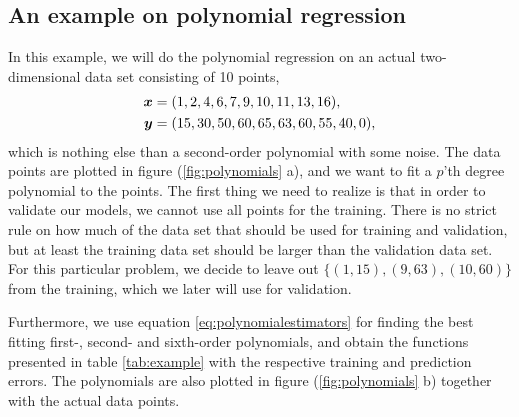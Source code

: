 \subsection{An example on polynomial regression} \label{sec:example}
In this example, we will do the polynomial regression on an actual two-dimensional data set consisting of 10 points,
\begin{equation}
\begin{aligned}
\boldsymbol{{x}}&=(1,2,4,6,7,9,10,11,13,16),\\
\boldsymbol{{y}}&=(15,30,50,60,65,63,60,55,40,0),
\label{eq:datapoints}
\end{aligned}
\end{equation}
which is nothing else than a second-order polynomial with some noise. The data points are plotted in figure (\ref{fig:polynomials} a), and we want to fit a $p$'th degree polynomial to the points. The first thing we need to realize is that in order to validate our models, we cannot use all points for the training. There is no strict rule on how much of the data set that should be used for training and validation, but at least the training data set should be larger than the validation data set. For this particular problem, we decide to leave out $\{(1,15),(9,63),(10,60)\}$ from the training, which we later will use for validation.

Furthermore, we use equation \eqref{eq:polynomialestimators} for finding the best fitting first-, second- and sixth-order polynomials, and obtain the functions presented in table \eqref{tab:example} with the respective training and prediction errors. The polynomials are also plotted in figure (\ref{fig:polynomials} b) together with the actual data points.

